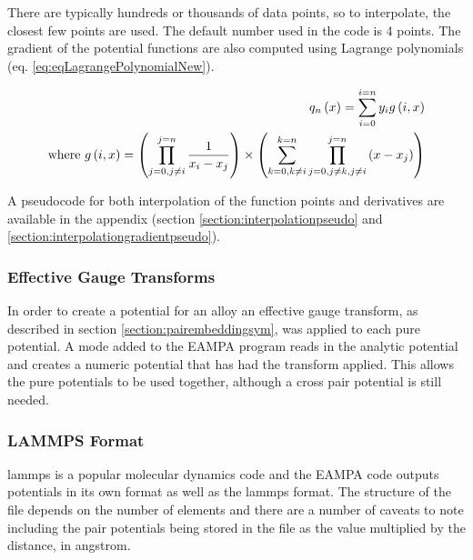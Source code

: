 There are typically hundreds or thousands of data points, so to interpolate, the closest few points are used.  The default number used in the code is 4 points.  The gradient of the potential functions are also computed using Lagrange polynomials (eq. \ref{eq:eqLagrangePolynomialNew}).

\begin{equation}
\begin{split}
q_n \left( x \right) = \sum_{i=0}^{i=n} y_{i} g \left(i,  x \right) \\
\textnormal{where    } g \left(i, x \right) = \left( \prod_{j=0, j \neq i}^{j=n} \frac{1}{x_i - x_j} \right) \times \left( \sum_{k=0, k \neq i}^{k=n} \prod_{j=0, j \neq k, j \neq i}^{j=n} \left( x - x_j \right) \right)
\end{split}
\label{eq:eqLagrangePolynomialNew}
\end{equation}

A pseudocode for both interpolation of the function points and derivatives are available in the appendix (section \ref{section:interpolationpseudo} and \ref{section:interpolationgradientpseudo}).



\subsubsection{Effective Gauge Transforms}

In order to create a potential for an alloy an effective gauge transform, as described in section \ref{section:pairembeddingsym}, was applied to each pure potential.  A mode added to the EAMPA program reads in the analytic potential and creates a numeric potential that has had the transform applied.  This allows the pure potentials to be used together, although a cross pair potential is still needed.



\subsubsection{LAMMPS Format}

\acrshort{lammps} is a popular molecular dynamics code and the EAMPA code outputs potentials in its own format as well as the \acrshort{lammps} format.  The structure of the file depends on the number of elements and there are a number of caveats to note including the pair potentials being stored in the file as the value multiplied by the distance, in angstrom\cite{lammpseamformat}.




